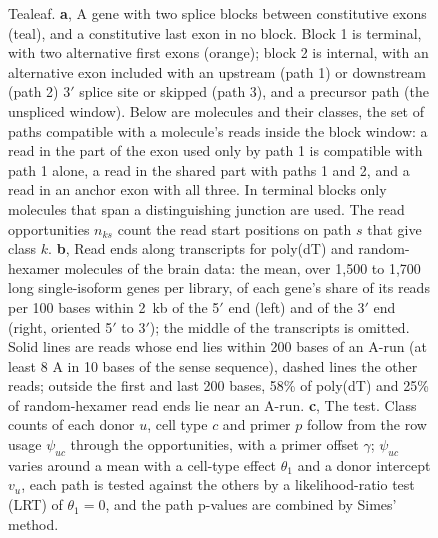 \documentclass[11pt]{article}
\newcommand{\logit}{\operatorname{logit}}
\newcommand{\BetaDist}{\operatorname{Beta}}
\begin{document}
\begin{figure}[tbp]
\begin{minipage}[t]{0.5\textwidth}
\end{minipage}
\caption{Tealeaf. \textbf{a}, A gene with two splice blocks between constitutive exons (teal), and a constitutive last exon in no block. Block 1 is terminal, with two alternative first exons (orange); block 2 is internal, with an alternative exon included with an upstream (path 1) or downstream (path 2) 3$'$ splice site or skipped (path 3), and a precursor path (the unspliced window). Below are molecules and their classes, the set of paths compatible with a molecule's reads inside the block window: a read in the part of the exon used only by path 1 is compatible with path 1 alone, a read in the shared part with paths 1 and 2, and a read in an anchor exon with all three. In terminal blocks only molecules that span a distinguishing junction are used. The read opportunities $n_{ks}$ count the read start positions on path $s$ that give class $k$. \textbf{b}, Read ends along transcripts for poly(dT) and random-hexamer molecules of the brain data: the mean, over 1{,}500 to 1{,}700 long single-isoform genes per library, of each gene's share of its reads per 100 bases within 2~kb of the 5$'$ end (left) and of the 3$'$ end (right, oriented 5$'$ to 3$'$); the middle of the transcripts is omitted. Solid lines are reads whose end lies within 200 bases of an A-run (at least 8 A in 10 bases of the sense sequence), dashed lines the other reads; outside the first and last 200 bases, 58\% of poly(dT) and 25\% of random-hexamer read ends lie near an A-run. \textbf{c}, The test. Class counts of each donor $u$, cell type $c$ and primer $p$ follow from the row usage $\psi_{uc}$ through the opportunities, with a primer offset $\gamma$; $\psi_{uc}$ varies around a mean with a cell-type effect $\theta_1$ and a donor intercept $v_u$, each path is tested against the others by a likelihood-ratio test (LRT) of $\theta_1=0$, and the path p-values are combined by Simes' method.}
\label{fig:overview}
\end{figure}
\end{document}
